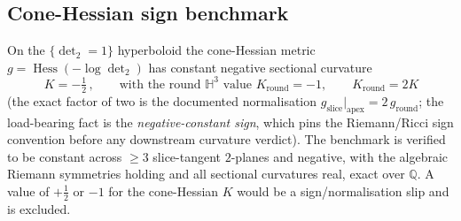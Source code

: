 \documentclass[11pt]{article}
\begin{document}
\subsection{Cone-Hessian sign benchmark}
On the $\{\det_2=1\}$ hyperboloid the cone-Hessian metric
$g=\operatorname{Hess}(-\log\det_2)$ has constant negative sectional curvature
\begin{equation}
\boxed{\,K=-\tfrac12\,},
\qquad\text{with the round }\mathbb{H}^3\text{ value }K_{\text{round}}=-1,
\qquad K_{\text{round}}=2K
\end{equation}
(the exact factor of two is the documented normalisation
$g_{\text{slice}}|_{\text{apex}}=2\,g_{\text{round}}$; the load-bearing fact is
the \emph{negative-constant sign}, which pins the Riemann/Ricci sign convention
before any downstream curvature verdict). The benchmark is verified to be
constant across $\ge 3$ slice-tangent $2$-planes and negative, with the algebraic
Riemann symmetries holding and all sectional curvatures real, exact over
$\mathbb{Q}$. A value of $+\tfrac12$ or $-1$ for the cone-Hessian $K$ would be a
sign/normalisation slip and is excluded.
\end{document}
